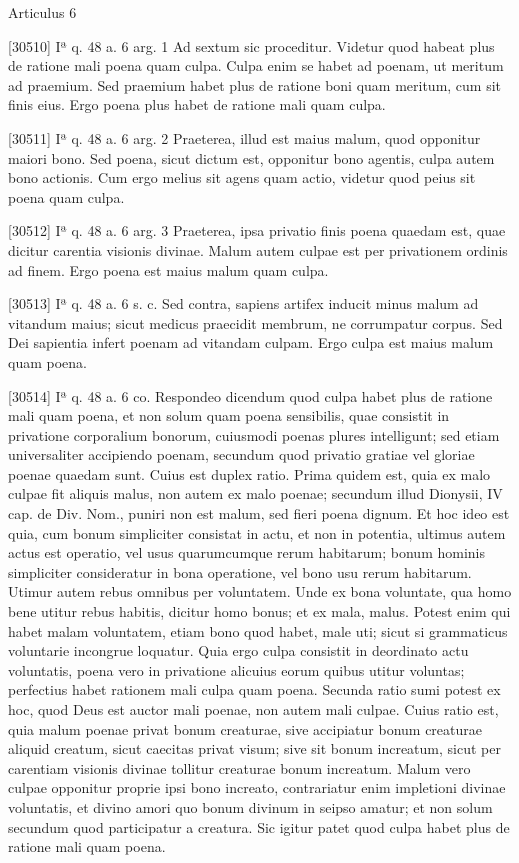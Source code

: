 \documentclass[10pt]{jsarticle} %
\begin{document}
Articulus 6

[30510] Iª q. 48 a. 6 arg. 1 Ad sextum sic proceditur. Videtur quod habeat plus de ratione mali poena quam culpa. Culpa enim se habet ad poenam, ut meritum ad praemium. Sed praemium habet plus de ratione boni quam meritum, cum sit finis eius. Ergo poena plus habet de ratione mali quam culpa.

[30511] Iª q. 48 a. 6 arg. 2 Praeterea, illud est maius malum, quod opponitur maiori bono. Sed poena, sicut dictum est, opponitur bono agentis, culpa autem bono actionis. Cum ergo melius sit agens quam actio, videtur quod peius sit poena quam culpa.

[30512] Iª q. 48 a. 6 arg. 3 Praeterea, ipsa privatio finis poena quaedam est, quae dicitur carentia visionis divinae. Malum autem culpae est per privationem ordinis ad finem. Ergo poena est maius malum quam culpa.

[30513] Iª q. 48 a. 6 s. c. Sed contra, sapiens artifex inducit minus malum ad vitandum maius; sicut medicus praecidit membrum, ne corrumpatur corpus. Sed Dei sapientia infert poenam ad vitandam culpam. Ergo culpa est maius malum quam poena.

[30514] Iª q. 48 a. 6 co. Respondeo dicendum quod culpa habet plus de ratione mali quam poena, et non solum quam poena sensibilis, quae consistit in privatione corporalium bonorum, cuiusmodi poenas plures intelligunt; sed etiam universaliter accipiendo poenam, secundum quod privatio gratiae vel gloriae poenae quaedam sunt. Cuius est duplex ratio. Prima quidem est, quia ex malo culpae fit aliquis malus, non autem ex malo poenae; secundum illud Dionysii, IV cap. de Div. Nom., puniri non est malum, sed fieri poena dignum. Et hoc ideo est quia, cum bonum simpliciter consistat in actu, et non in potentia, ultimus autem actus est operatio, vel usus quarumcumque rerum habitarum; bonum hominis simpliciter consideratur in bona operatione, vel bono usu rerum habitarum. Utimur autem rebus omnibus per voluntatem. Unde ex bona voluntate, qua homo bene utitur rebus habitis, dicitur homo bonus; et ex mala, malus. Potest enim qui habet malam voluntatem, etiam bono quod habet, male uti; sicut si grammaticus voluntarie incongrue loquatur. Quia ergo culpa consistit in deordinato actu voluntatis, poena vero in privatione alicuius eorum quibus utitur voluntas; perfectius habet rationem mali culpa quam poena. Secunda ratio sumi potest ex hoc, quod Deus est auctor mali poenae, non autem mali culpae. Cuius ratio est, quia malum poenae privat bonum creaturae, sive accipiatur bonum creaturae aliquid creatum, sicut caecitas privat visum; sive sit bonum increatum, sicut per carentiam visionis divinae tollitur creaturae bonum increatum. Malum vero culpae opponitur proprie ipsi bono increato, contrariatur enim impletioni divinae voluntatis, et divino amori quo bonum divinum in seipso amatur; et non solum secundum quod participatur a creatura. Sic igitur patet quod culpa habet plus de ratione mali quam poena.
\end{document}
